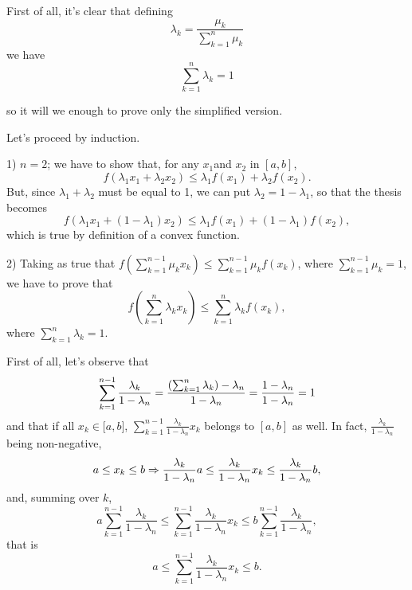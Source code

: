 \documentclass[12pt]{article}
\begin{document}
First of all, it's clear that defining
\[
\lambda _{k}=\frac{\mu _{k}}{\sum_{k=1}^{n}\mu _{k}}
\]
we have
\[
\sum_{k=1}^{n}\lambda _{k}=1
\]

so it will we enough to prove only the simplified version.

Let's proceed by induction.

1) $n=2$; we have to show that, for any $x_{1}$and $x_{2}$ in $[a,b]$, 
\[
f\left( \lambda _{1}x_{1}+\lambda _{2}x_{2}\right) \leq \lambda
_{1}f(x_{1})+\lambda _{2}f(x_{2}).
\]
But, since $\lambda _{1}+\lambda _{2}$ must be equal to 1, we can put $%
\lambda _{2}=1-\lambda _{1}$, so that the thesis becomes 
\[
f\left( \lambda _{1}x_{1}+\left( 1-\lambda _{1}\right) x_{2}\right) \leq
\lambda _{1}f(x_{1})+\left( 1-\lambda _{1}\right) f(x_{2}),
\]
which is true by definition of a convex function.

2) Taking as true that $f\left( \sum_{k=1}^{n-1}\mu _{k}x_{k}\right) \leq
\sum_{k=1}^{n-1}\mu _{k}f\left( x_{k}\right) $, where $\sum_{k=1}^{n-1}\mu
_{k}=1$, we have to prove that 
\[
f\left( \sum_{k=1}^{n}\lambda _{k}x_{k}\right) \leq \sum_{k=1}^{n}\lambda
_{k}f\left( x_{k}\right) ,
\]
where $\sum_{k=1}^{n}\lambda _{k}=1$.

First of all, let's observe that 
\[
\sum_{k=1}^{n-1}\frac{\lambda _{k}}{1-\lambda _{n}}=\frac{\left(
\sum_{k=1}^{n}\lambda _{k}\right) -\lambda _{n}}{1-\lambda _{n}}=\frac{%
1-\lambda _{n}}{1-\lambda _{n}}=1
\]
and that if all $x_{k}\in \lbrack a,b]$, $\sum_{k=1}^{n-1}\frac{\lambda _{k}%
}{1-\lambda _{n}}x_{k}$ belongs to $[a,b]$ as well. In fact, $\frac{\lambda
_{k}}{1-\lambda _{n}}$ being non-negative, 
\[
a\leq x_{k}\leq b\Rightarrow \frac{\lambda _{k}}{1-\lambda _{n}}a\leq \frac{%
\lambda _{k}}{1-\lambda _{n}}x_{k}\leq \frac{\lambda _{k}}{1-\lambda _{n}}b,
\]
and, summing over $k$,%
\[
a\sum_{k=1}^{n-1}\frac{\lambda _{k}}{1-\lambda _{n}}\leq \sum_{k=1}^{n-1}%
\frac{\lambda _{k}}{1-\lambda _{n}}x_{k}\leq b\sum_{k=1}^{n-1}\frac{\lambda
_{k}}{1-\lambda _{n}},
\]%
that is%
\[
a\leq \sum_{k=1}^{n-1}\frac{\lambda _{k}}{1-\lambda _{n}}x_{k}\leq b.
\]
\end{document}
